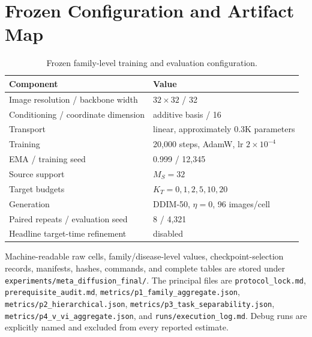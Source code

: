 \documentclass{article}
\newcommand{\KT}{K_T}
\newcommand{\MS}{M_S}
\begin{document}
\appendix
\section{Frozen Configuration and Artifact Map}

\begin{table}[h]
\caption{Frozen family-level training and evaluation configuration.}
\label{tab:config}
\centering
\small
\begin{tabular}{ll}
\toprule
Component & Value \\
\midrule
Image resolution / backbone width & $32\times32$ / 32 \\
Conditioning / coordinate dimension & additive basis / 16 \\
Transport & linear, approximately 0.3K parameters \\
Training & 20,000 steps, AdamW, lr $2\times10^{-4}$ \\
EMA / training seed & 0.999 / 12,345 \\
Source support & $\MS=32$ \\
Target budgets & $\KT=0,1,2,5,10,20$ \\
Generation & DDIM-50, $\eta=0$, 96 images/cell \\
Paired repeats / evaluation seed & 8 / 4,321 \\
Headline target-time refinement & disabled \\
\bottomrule
\end{tabular}
\end{table}

Machine-readable raw cells, family/disease-level values, checkpoint-selection records,
manifests, hashes, commands, and complete tables are stored under
\texttt{experiments/meta\_diffusion\_final/}.  The principal files are
\texttt{protocol\_lock.md}, \texttt{prerequisite\_audit.md},
\texttt{metrics/p1\_family\_aggregate.json},
\texttt{metrics/p2\_hierarchical.json},
\texttt{metrics/p3\_task\_separability.json},
\texttt{metrics/p4\_v\_vi\_aggregate.json}, and
\texttt{runs/execution\_log.md}.  Debug runs are explicitly named and excluded from every
reported estimate.
\end{document}
